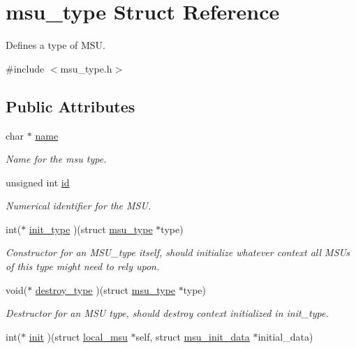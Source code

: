 \hypertarget{structmsu__type}{\section{msu\-\_\-type Struct Reference}
\label{structmsu__type}
}


Defines a type of M\-S\-U.  




{\ttfamily \#include $<$msu\-\_\-type.\-h$>$}

\subsection*{Public Attributes}
\begin{DoxyCompactItemize}
\item 
char $\ast$ \hyperlink{structmsu__type_ade4e1d9d98f0e22f3a54986919b07665}{name}
\begin{DoxyCompactList}\small\item\em Name for the msu type. \end{DoxyCompactList}\item 
unsigned int \hyperlink{structmsu__type_a0d626321555fed55c525a480dee99b83}{id}
\begin{DoxyCompactList}\small\item\em Numerical identifier for the M\-S\-U. \end{DoxyCompactList}\item 
int($\ast$ \hyperlink{structmsu__type_a5dd9b478727fefecff8cf16525003135}{init\-\_\-type} )(struct \hyperlink{structmsu__type}{msu\-\_\-type} $\ast$type)
\begin{DoxyCompactList}\small\item\em Constructor for an M\-S\-U\-\_\-type itself, should initialize whatever context all M\-S\-Us of this type might need to rely upon. \end{DoxyCompactList}\item 
void($\ast$ \hyperlink{structmsu__type_a4386613c175f4fa42c1ae5b5027246ce}{destroy\-\_\-type} )(struct \hyperlink{structmsu__type}{msu\-\_\-type} $\ast$type)
\begin{DoxyCompactList}\small\item\em Destructor for an M\-S\-U type, should destroy context initialized in {\ttfamily init\-\_\-type}. \end{DoxyCompactList}\item 
int($\ast$ \hyperlink{structmsu__type_af17ea5ed6d4071e62d80f545139fb425}{init} )(struct \hyperlink{structlocal__msu}{local\-\_\-msu} $\ast$self, struct \hyperlink{structmsu__init__data}{msu\-\_\-init\-\_\-data} $\ast$initial\-\_\-data)

\end{DoxyCompactItemize}

